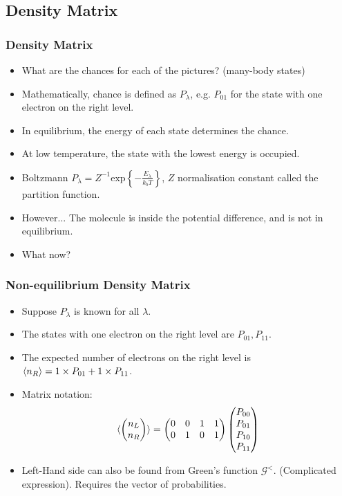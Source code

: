 \subsection*{Density Matrix}
\begin{frame}
    \frametitle{Density Matrix}
    \begin{itemize}
        \item What are the chances for each of the pictures? (many-body states)
        \item Mathematically, chance is defined as $P_{\lambda}$, e.g. $P_{01}$ for the state with one electron on the right level.
        \item In equilibrium, the energy of each state determines the chance.
        \item At low temperature, the state with the lowest energy is occupied.
        \item Boltzmann $P_\lambda = Z^{-1} \text{exp}\left\{ - \frac{E_\lambda}{k_b T}\right\}$, $Z$ normalisation constant called the partition function.
        \item However... The molecule is inside the potential difference, and is not in equilibrium.
        \item What now?
    \end{itemize} 
\end{frame}%
\begin{frame}
    \frametitle{Non-equilibrium Density Matrix}
    \begin{itemize}
        \item Suppose $P_\lambda$ is known for all $\lambda$.
        \item The states with one electron on the right level are $P_{01}, P_{11}$.
        \item The expected number of electrons on the right level is $\braket{n_R} = 1 \times P_{01} + 1 \times P_{11}$.
        \item Matrix notation: \begin{align*}\braket{ \begin{pmatrix} n_L \\ n_R \end{pmatrix}} = \begin{pmatrix} 0 & 0 & 1 & 1 \\ 0 & 1 & 0 & 1\end{pmatrix}\begin{pmatrix} P_{00} \\ P_{01} \\ P_{10} \\ P_{11} \end{pmatrix}\end{align*}
        \item Left-Hand side can also be found from Green's function $\mathscr{G}^{<}$. (Complicated expression). Requires the vector of probabilities.
    \end{itemize} 
\end{frame}%
